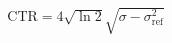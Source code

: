 \begin{align}
\textrm{CTR} = 4\sqrt{\ln{2}}\sqrt{\sigma-\sigma_\textrm{ref}^2}
\label{eqn:ctr-fromreference}
\end{align}